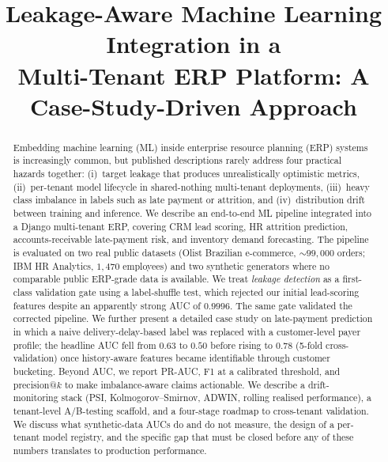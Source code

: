 \documentclass[conference]{IEEEtran}
\begin{document}
\title{Leakage-Aware Machine Learning Integration in a\\Multi-Tenant ERP Platform: A Case-Study-Driven Approach}

\author{%
}

\maketitle

\begin{abstract}
Embedding machine learning (ML) inside enterprise resource planning (ERP)
systems is increasingly common, but published descriptions rarely address
four practical hazards together: (i)~target leakage that produces
unrealistically optimistic metrics, (ii)~per-tenant model lifecycle in
shared-nothing multi-tenant deployments, (iii)~heavy class imbalance in
labels such as late payment or attrition, and (iv)~distribution drift
between training and inference. We describe an end-to-end ML pipeline
integrated into a Django multi-tenant ERP, covering CRM lead scoring, HR
attrition prediction, accounts-receivable late-payment risk, and inventory
demand forecasting. The pipeline is evaluated on two real public datasets
(Olist Brazilian e-commerce, $\sim$$99{,}000$ orders; IBM HR Analytics,
$1{,}470$ employees) and two synthetic generators where no comparable public
ERP-grade data is available. We treat \emph{leakage detection} as a
first-class validation gate using a label-shuffle test, which rejected our
initial lead-scoring features despite an apparently strong AUC of $0.9996$.
The same gate validated the corrected pipeline. We further present a
detailed case study on late-payment prediction in which a naive
delivery-delay-based label was replaced with a customer-level payer profile;
the headline AUC fell from $0.63$ to $0.50$ before rising to $0.78$
(5-fold cross-validation) once history-aware features became identifiable
through customer bucketing. Beyond AUC, we report PR-AUC, F1 at a calibrated
threshold, and precision@$k$ to make imbalance-aware claims actionable. We
describe a drift-monitoring stack (PSI, Kolmogorov--Smirnov, ADWIN, rolling
realised performance), a tenant-level A/B-testing scaffold, and a four-stage
roadmap to cross-tenant validation. We discuss what synthetic-data AUCs do
and do not measure, the design of a per-tenant model registry, and the
specific gap that must be closed before any of these numbers translates to
production performance.
\end{abstract}
\end{document}
